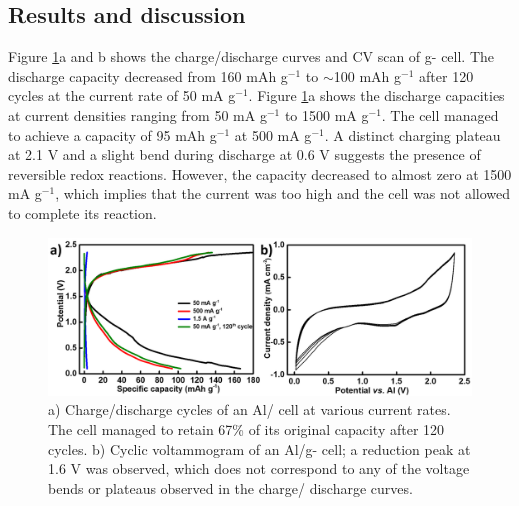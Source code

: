 \subsection{Results and discussion}
Figure \ref{Figures/chap6fig:CNUcdccv}a and b shows the charge/discharge curves and CV scan of g- cell. The discharge capacity decreased from 160 mAh g$^{-1}$ to $\sim$100 mAh g$^{-1}$ after 120 cycles at the current rate of 50 mA g$^{-1}$. Figure \ref{Figures/chap6fig:CNUcdccv}a shows the discharge capacities at current densities ranging from 50 mA g$^{-1}$ to 1500 mA g$^{-1}$. The cell managed to achieve a capacity of 95 mAh g$^{-1}$ at 500 mA g$^{-1}$. A distinct charging plateau at 2.1 V and a slight bend during discharge at 0.6 V suggests the presence of reversible redox reactions. However, the capacity decreased to almost zero at 1500 mA g$^{-1}$, which implies that the current was too high and the cell was not allowed to complete its reaction. 

\begin{figure}[th!]
\centering
\includegraphics[width=\textwidth]{Figures/chap6fig/CNUcdccv}
\caption{a) Charge/discharge cycles of an Al/ cell at various current rates. The cell managed to retain 67\% of its original capacity after 120 cycles. b) Cyclic voltammogram of an Al/g- cell; a reduction peak at 1.6 V was observed, which does not correspond to any of the voltage bends or plateaus observed in the charge/ discharge curves. }
\label{Figures/chap6fig:CNUcdccv}
\end{figure}

